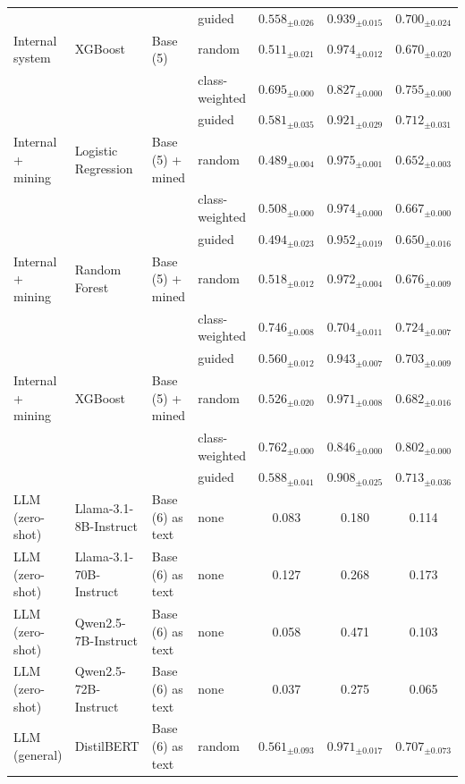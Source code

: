 \begin{table}[htbp]
{\begin{tabular}{llllccc}
 &  &  & guided & $0.558_{\pm 0.026}$ & $0.939_{\pm 0.015}$ & $0.700_{\pm 0.024}$ \\
\addlinespace
Internal system & XGBoost & Base (5) & random & $0.511_{\pm 0.021}$ & $0.974_{\pm 0.012}$ & $0.670_{\pm 0.020}$ \\
 &  &  & class-weighted & $0.695_{\pm 0.000}$ & $0.827_{\pm 0.000}$ & $0.755_{\pm 0.000}$ \\
 &  &  & guided & $0.581_{\pm 0.035}$ & $0.921_{\pm 0.029}$ & $0.712_{\pm 0.031}$ \\
\midrule
Internal + mining & Logistic Regression & Base (5) + mined & random & $0.489_{\pm 0.004}$ & $0.975_{\pm 0.001}$ & $0.652_{\pm 0.003}$ \\
 &  &  & class-weighted & $0.508_{\pm 0.000}$ & $0.974_{\pm 0.000}$ & $0.667_{\pm 0.000}$ \\
 &  &  & guided & $0.494_{\pm 0.023}$ & $0.952_{\pm 0.019}$ & $0.650_{\pm 0.016}$ \\
\addlinespace
Internal + mining & Random Forest & Base (5) + mined & random & $0.518_{\pm 0.012}$ & $0.972_{\pm 0.004}$ & $0.676_{\pm 0.009}$ \\
 &  &  & class-weighted & $0.746_{\pm 0.008}$ & $0.704_{\pm 0.011}$ & $0.724_{\pm 0.007}$ \\
 &  &  & guided & $0.560_{\pm 0.012}$ & $0.943_{\pm 0.007}$ & $0.703_{\pm 0.009}$ \\
\addlinespace
Internal + mining & XGBoost & Base (5) + mined & random & $0.526_{\pm 0.020}$ & $0.971_{\pm 0.008}$ & $0.682_{\pm 0.016}$ \\
 &  &  & class-weighted & $0.762_{\pm 0.000}$ & $0.846_{\pm 0.000}$ & $0.802_{\pm 0.000}$ \\
 &  &  & guided & $0.588_{\pm 0.041}$ & $0.908_{\pm 0.025}$ & $0.713_{\pm 0.036}$ \\
\midrule
LLM (zero-shot) & Llama-3.1-8B-Instruct & Base (6) as text & none & 0.083 & 0.180 & 0.114 \\
\addlinespace
LLM (zero-shot) & Llama-3.1-70B-Instruct & Base (6) as text & none & 0.127 & 0.268 & 0.173 \\
\addlinespace
LLM (zero-shot) & Qwen2.5-7B-Instruct & Base (6) as text & none & 0.058 & 0.471 & 0.103 \\
\addlinespace
LLM (zero-shot) & Qwen2.5-72B-Instruct & Base (6) as text & none & 0.037 & 0.275 & 0.065 \\
\addlinespace
LLM (general) & DistilBERT & Base (6) as text & random & $0.561_{\pm 0.093}$ & $0.971_{\pm 0.017}$ & $0.707_{\pm 0.073}$ \\

\end{tabular}}
\end{table}
